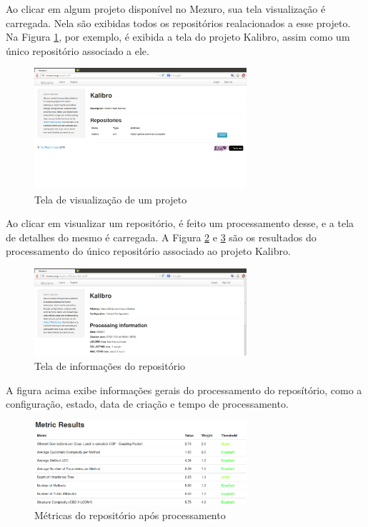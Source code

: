 Ao clicar em algum projeto disponível no Mezuro, sua tela visualização é carregada. Nela são exibidas todos os repositórios realacionados a esse projeto. Na Figura \ref{fig:mezuro-repositories}, por exemplo, é exibida a tela do projeto Kalibro, assim como um único repositório associado a ele.

\graphicspath{{figuras/}}
\begin{figure}[H]
\centering
\includegraphics[width=0.7\textwidth]{mezuro-repositories}
\caption{Tela de visualização de um projeto}
\label{fig:mezuro-repositories}
\end{figure}

Ao clicar em visualizar um repositório, é feito um processamento desse, e a tela de detalhes do mesmo é carregada. A Figura \ref{fig:mezuro-info} e \ref{fig:mezuro-result} são os resultados do processamento do único repositório associado ao projeto Kalibro.

\graphicspath{{figuras/}}
\begin{figure}[H]
\centering
\includegraphics[width=0.7\textwidth]{mezuro-info}
\caption{Tela de informações do repositório}
\label{fig:mezuro-info}
\end{figure}

A figura acima exibe informações gerais do processamento do reposítório, como a configuração, estado, data de criação e tempo de processamento.

\graphicspath{{figuras/}}
\begin{figure}[H]
\centering
\includegraphics[width=0.7\textwidth]{mezuro-result}
\caption{Métricas do repositório após processamento}
\label{fig:mezuro-result}
\end{figure}

